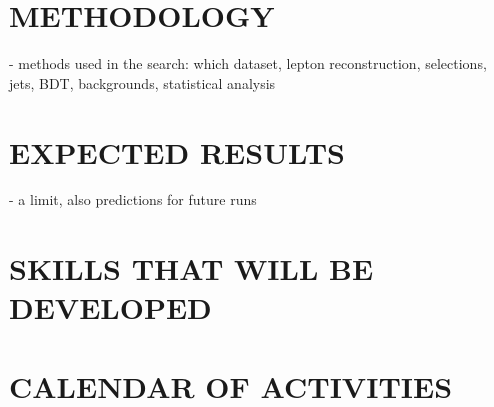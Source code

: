 \documentclass[final,3p]{CSP}
\begin{document}
\section{METHODOLOGY}
- methods used in the search: which dataset,  lepton reconstruction, selections, jets, BDT, backgrounds, statistical analysis

\section{EXPECTED RESULTS}
- a limit, also predictions for future runs


\cleardoublepage



\appendix
\section{SKILLS THAT WILL BE DEVELOPED}

\section{CALENDAR OF ACTIVITIES}
\end{document}
